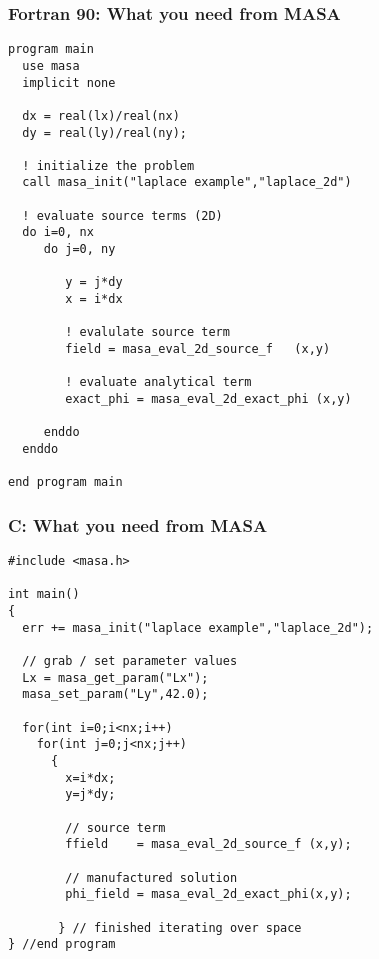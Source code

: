 \documentclass[mathserif]{beamer}
\begin{document}
\begin{frame}[fragile]
\frametitle{Fortran 90: What you need from MASA}
{\tiny
\begin{verbatim}
program main
  use masa
  implicit none

  dx = real(lx)/real(nx)
  dy = real(ly)/real(ny);

  ! initialize the problem
  call masa_init("laplace example","laplace_2d")

  ! evaluate source terms (2D)
  do i=0, nx
     do j=0, ny
         
        y = j*dy        
        x = i*dx
        
        ! evalulate source term
        field = masa_eval_2d_source_f   (x,y)

        ! evaluate analytical term
        exact_phi = masa_eval_2d_exact_phi (x,y)

     enddo
  enddo

end program main

\end{verbatim}
}
\end{frame}

\begin{frame}[fragile]
\frametitle{C: What you need from MASA}
{\tiny
\begin{verbatim}
#include <masa.h>

int main()
{
  err += masa_init("laplace example","laplace_2d");

  // grab / set parameter values
  Lx = masa_get_param("Lx");
  masa_set_param("Ly",42.0);

  for(int i=0;i<nx;i++)
    for(int j=0;j<nx;j++)
      {  
        x=i*dx;
        y=j*dy;

        // source term
        ffield    = masa_eval_2d_source_f (x,y);

        // manufactured solution
        phi_field = masa_eval_2d_exact_phi(x,y);

       } // finished iterating over space
} //end program
\end{verbatim}
}
\end{frame}

\end{document}
